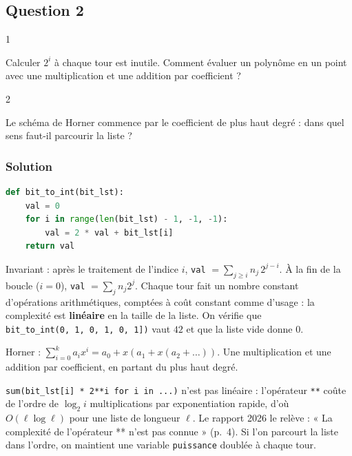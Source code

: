 \documentclass[11pt,a4paper]{article}
\begin{document}
\hypertarget{question-2}{%
\subsection{Question 2}\label{question-2}}

\begin{indication}{1}

Calculer \(2^i\) à chaque tour est inutile. Comment évaluer un polynôme en un point avec une multiplication et une addition par coefficient ?

\end{indication}

\begin{indication}{2}

Le schéma de Horner commence par le coefficient de plus haut degré : dans quel sens faut-il parcourir la liste ?

\end{indication}

\hypertarget{solution-1}{%
\subsubsection{Solution}\label{solution-1}}

\begin{lstlisting}[language=Python]
def bit_to_int(bit_lst):
    val = 0
    for i in range(len(bit_lst) - 1, -1, -1):
        val = 2 * val + bit_lst[i]
    return val
\end{lstlisting}

Invariant : après le traitement de l'indice \(i\), \texttt{val} \(= \sum_{j \ge i} n_j\, 2^{j-i}\). À la fin de la boucle (\(i = 0\)), \texttt{val} \(= \sum_j n_j 2^j\). Chaque tour fait un nombre constant d'opérations arithmétiques, comptées à coût constant comme d'usage : la complexité est \textbf{linéaire} en la taille de la liste. On vérifie que \texttt{bit\_to\_int(\allowbreak{}{[}0,\allowbreak{}\ 1,\allowbreak{}\ 0,\allowbreak{}\ 1,\allowbreak{}\ 0,\allowbreak{}\ 1{]}\allowbreak{})\allowbreak{}} vaut \(42\) et que la liste vide donne \(0\).

\begin{methode}

Horner : \(\sum_{i=0}^{k} a_i x^i = a_0 + x(a_1 + x(a_2 + \dots))\). Une multiplication et une addition par coefficient, en partant du plus haut degré.

\end{methode}

\begin{piege}

\texttt{sum(\allowbreak{}bit\_lst{[}i{]}\allowbreak{}\ *\ 2**i\ for\ i\ in\ ...)\allowbreak{}} n'est pas linéaire : l'opérateur \texttt{**} coûte de l'ordre de \(\log_2 i\) multiplications par exponentiation rapide, d'où \(O(\ell \log \ell)\) pour une liste de longueur \(\ell\). Le rapport 2026 le relève : « La complexité de l'opérateur ** n'est pas connue » (p.~4). Si l'on parcourt la liste dans l'ordre, on maintient une variable \texttt{puissance} doublée à chaque tour.

\end{piege}
\end{document}
